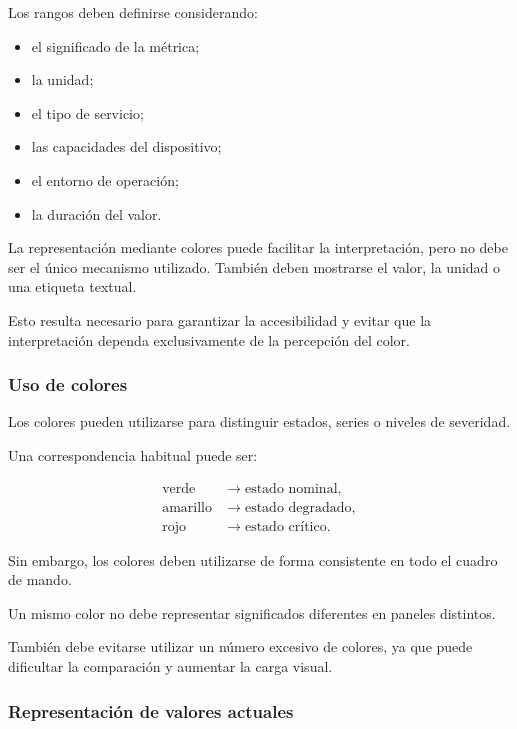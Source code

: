 Los rangos deben definirse considerando:

\begin{itemize}
    \item el significado de la métrica;

    \item la unidad;

    \item el tipo de servicio;

    \item las capacidades del dispositivo;

    \item el entorno de operación;

    \item la duración del valor.
\end{itemize}

La representación mediante colores puede facilitar la interpretación,
pero no debe ser el único mecanismo utilizado. También deben mostrarse el
valor, la unidad o una etiqueta textual.

Esto resulta necesario para garantizar la accesibilidad y evitar que la
interpretación dependa exclusivamente de la percepción del color.


\subsubsection*{Uso de colores}

Los colores pueden utilizarse para distinguir estados, series o niveles
de severidad.

Una correspondencia habitual puede ser:

\[
\begin{aligned}
    \text{verde}
    &\longrightarrow
    \text{estado nominal},\\
    \text{amarillo}
    &\longrightarrow
    \text{estado degradado},\\
    \text{rojo}
    &\longrightarrow
    \text{estado crítico}.
\end{aligned}
\]

Sin embargo, los colores deben utilizarse de forma consistente en todo el
cuadro de mando.

Un mismo color no debe representar significados diferentes en paneles
distintos.

También debe evitarse utilizar un número excesivo de colores, ya que
puede dificultar la comparación y aumentar la carga visual.


\subsubsection*{Representación de valores actuales}

